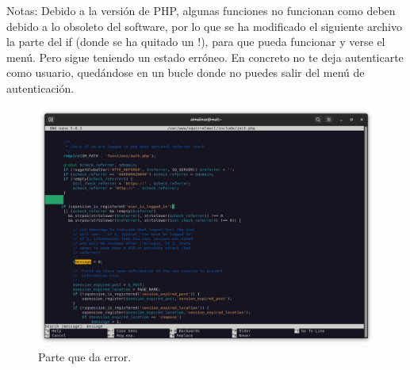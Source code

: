 Notas: Debido a la versión de PHP, algunas funciones no funcionan como deben debido a lo obsoleto del software, por lo que se ha modificado el siguiente archivo la parte del if (donde se ha quitado un !), para que pueda funcionar y verse el menú. Pero sigue teniendo un estado erróneo. En concreto no te deja autenticarte como usuario, quedándose en un bucle donde no puedes salir del menú de autenticación.

\begin{figure}[H]
	\centering
	\includegraphics[scale=0.30]{29}
	\caption{Parte que da error.}
\end{figure}



%



%


